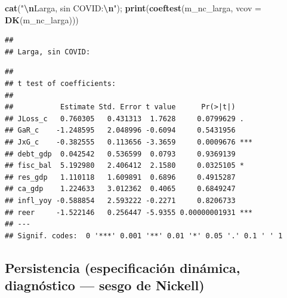 \documentclass[
]{article}
\newenvironment{Shaded}{\begin{snugshade}}{\end{snugshade}}
\newcommand{\AttributeTok}[1]{\textcolor[rgb]{0.13,0.29,0.53}{#1}}
\newcommand{\FunctionTok}[1]{\textcolor[rgb]{0.13,0.29,0.53}{\textbf{#1}}}
\newcommand{\NormalTok}[1]{#1}
\newcommand{\SpecialCharTok}[1]{\textcolor[rgb]{0.81,0.36,0.00}{\textbf{#1}}}
\newcommand{\StringTok}[1]{\textcolor[rgb]{0.31,0.60,0.02}{#1}}
\begin{document}
\begin{Shaded}
\begin{Highlighting}[]
\FunctionTok{cat}\NormalTok{(}\StringTok{"}\SpecialCharTok{\textbackslash{}n}\StringTok{Larga, sin COVID:}\SpecialCharTok{\textbackslash{}n}\StringTok{"}\NormalTok{); }\FunctionTok{print}\NormalTok{(}\FunctionTok{coeftest}\NormalTok{(m\_nc\_larga, }\AttributeTok{vcov =} \FunctionTok{DK}\NormalTok{(m\_nc\_larga)))}
\end{Highlighting}
\end{Shaded}

\begin{verbatim}
## 
## Larga, sin COVID:
\end{verbatim}

\begin{verbatim}
## 
## t test of coefficients:
## 
##           Estimate Std. Error t value      Pr(>|t|)    
## JLoss_c   0.760305   0.431313  1.7628     0.0799629 .  
## GaR_c    -1.248595   2.048996 -0.6094     0.5431956    
## JxG_c    -0.382555   0.113656 -3.3659     0.0009676 ***
## debt_gdp  0.042542   0.536599  0.0793     0.9369139    
## fisc_bal  5.192980   2.406412  2.1580     0.0325105 *  
## res_gdp   1.110118   1.609891  0.6896     0.4915287    
## ca_gdp    1.224633   3.012362  0.4065     0.6849247    
## infl_yoy -0.588854   2.593222 -0.2271     0.8206733    
## reer     -1.522146   0.256447 -5.9355 0.00000001931 ***
## ---
## Signif. codes:  0 '***' 0.001 '**' 0.01 '*' 0.05 '.' 0.1 ' ' 1
\end{verbatim}

\subsection{Persistencia (especificación dinámica, diagnóstico --- sesgo
de
Nickell)}\label{persistencia-especificaciuxf3n-dinuxe1mica-diagnuxf3stico-sesgo-de-nickell}
\end{document}
